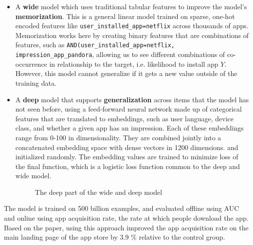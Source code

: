 \documentclass[11pt, table]{diazessay} %
\begin{document}
\begin{sloppypar}
\begin{itemize}
  \item A \textbf{wide} model which uses traditional tabular features to improve the model's \textbf{memorization}. This is a general linear model trained on sparse, one-hot encoded features like \texttt{user_installed_app=netflix} across thousands of apps. Memorization works here by creating binary features that are combinations of features, such as \texttt{AND(user_installed_app=netflix, impression_app_pandora}, allowing us to see different combinations of co-occurrence in relationship to the target, i.e. likelihood to install app $Y$. However, this model cannot generalize if it gets a new value outside of the training data.
  \item A \textbf{deep} model that supports \textbf{generalization} across items that the model has not seen before, using a feed-forward neural network made up of categorical features that are translated to embeddings, such as user language, device class, and whether a given app has an impression. Each of these embeddings range from 0-100 in dimensionality. They are combined jointly into a concatenated embedding space with dense vectors in 1200 dimensions.  and initialized randomly. The embedding values are trained to minimize loss of the final function, which is a logistic loss function common to the deep and wide model.  
\begin{figure}[H]
\caption{The deep part of the wide and deep model \citep{cheng2016wide}}
\end{figure}
\end{itemize}

The model is trained on 500 billion examples, and evaluated offline using AUC and online using app acquisition rate, the rate at which people download the app. Based on the paper, using this approach improved the app acquisition rate on the main landing page of the app store by 3.9 \% relative to the control group.



\end{sloppypar}
\end{document}
